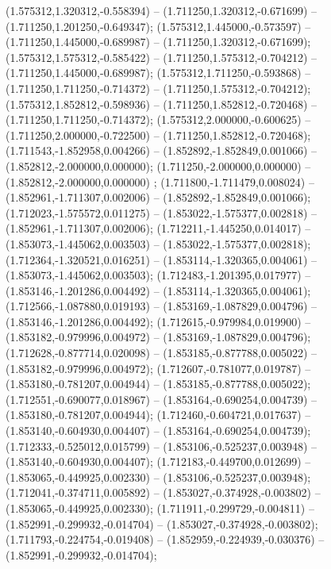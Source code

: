  (1.575312,1.320312,-0.558394) -- (1.711250,1.320312,-0.671699) -- (1.711250,1.201250,-0.649347);
 (1.575312,1.445000,-0.573597) -- (1.711250,1.445000,-0.689987) -- (1.711250,1.320312,-0.671699);
 (1.575312,1.575312,-0.585422) -- (1.711250,1.575312,-0.704212) -- (1.711250,1.445000,-0.689987);
 (1.575312,1.711250,-0.593868) -- (1.711250,1.711250,-0.714372) -- (1.711250,1.575312,-0.704212);
 (1.575312,1.852812,-0.598936) -- (1.711250,1.852812,-0.720468) -- (1.711250,1.711250,-0.714372);
 (1.575312,2.000000,-0.600625) -- (1.711250,2.000000,-0.722500) -- (1.711250,1.852812,-0.720468);
 (1.711543,-1.852958,0.004266) -- (1.852892,-1.852849,0.001066) -- (1.852812,-2.000000,0.000000);
 (1.711250,-2.000000,0.000000) -- (1.852812,-2.000000,0.000000) ;
 (1.711800,-1.711479,0.008024) -- (1.852961,-1.711307,0.002006) -- (1.852892,-1.852849,0.001066);
 (1.712023,-1.575572,0.011275) -- (1.853022,-1.575377,0.002818) -- (1.852961,-1.711307,0.002006);
 (1.712211,-1.445250,0.014017) -- (1.853073,-1.445062,0.003503) -- (1.853022,-1.575377,0.002818);
 (1.712364,-1.320521,0.016251) -- (1.853114,-1.320365,0.004061) -- (1.853073,-1.445062,0.003503);
 (1.712483,-1.201395,0.017977) -- (1.853146,-1.201286,0.004492) -- (1.853114,-1.320365,0.004061);
 (1.712566,-1.087880,0.019193) -- (1.853169,-1.087829,0.004796) -- (1.853146,-1.201286,0.004492);
 (1.712615,-0.979984,0.019900) -- (1.853182,-0.979996,0.004972) -- (1.853169,-1.087829,0.004796);
 (1.712628,-0.877714,0.020098) -- (1.853185,-0.877788,0.005022) -- (1.853182,-0.979996,0.004972);
 (1.712607,-0.781077,0.019787) -- (1.853180,-0.781207,0.004944) -- (1.853185,-0.877788,0.005022);
 (1.712551,-0.690077,0.018967) -- (1.853164,-0.690254,0.004739) -- (1.853180,-0.781207,0.004944);
 (1.712460,-0.604721,0.017637) -- (1.853140,-0.604930,0.004407) -- (1.853164,-0.690254,0.004739);
 (1.712333,-0.525012,0.015799) -- (1.853106,-0.525237,0.003948) -- (1.853140,-0.604930,0.004407);
 (1.712183,-0.449700,0.012699) -- (1.853065,-0.449925,0.002330) -- (1.853106,-0.525237,0.003948);
 (1.712041,-0.374711,0.005892) -- (1.853027,-0.374928,-0.003802) -- (1.853065,-0.449925,0.002330);
 (1.711911,-0.299729,-0.004811) -- (1.852991,-0.299932,-0.014704) -- (1.853027,-0.374928,-0.003802);
 (1.711793,-0.224754,-0.019408) -- (1.852959,-0.224939,-0.030376) -- (1.852991,-0.299932,-0.014704);
